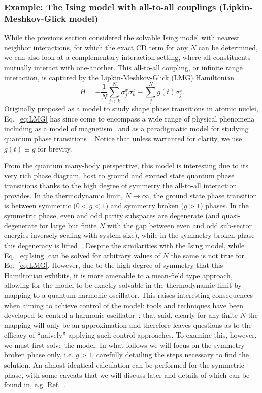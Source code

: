 \subsubsection{Example: The Ising model with all-to-all couplings (Lipkin-Meshkov-Glick model)}
\label{ex:LMGmodel}
While the previous section considered the solvable Ising model with nearest neighbor interactions, for which the exact CD term for any $N$ can be determined, we can also look at a complementary interaction setting, where all constituents mutually interact with one-another. This all-to-all coupling, or infinite range interaction, is captured by the Lipkin-Meshkov-Glick (LMG) Hamiltonian
\begin{equation}\label{eq:LMG}
H = - \frac{1}{N}\sum_{j<k}^N \sigma^x_j \sigma^x_{k} -\sum_j^N g(t) \sigma_j^z.
\end{equation}
Originally proposed as a model to study shape phase transitions in atomic nuclei, Eq.~\eqref{eq:LMG} has since come to encompass a wide range of physical phenomena including as a model of magnetism~\cite{LMG1, LMG2} and as a paradigmatic model for studying quantum phase transitions~\cite{ESQPTreview}. Notice that unless warranted for clarity, we use $g(t)\equiv g$ for brevity.

From the quantum many-body perspective, this model is interesting due to its very rich phase diagram, host to ground and excited state quantum phase transitions thanks to the high degree of symmetry the all-to-all interaction provides. In the thermodynamic limit, $N\to \infty$, the ground state phase transition is between symmetric ($0\!<\!g\!<\!1$) and symmetry broken ($g\!>\!1$) phases. In the symmetric phase, even and odd parity subspaces are degenerate (and quasi-degenerate for large but finite $N$ with the gap between even and odd sub-sector energies inversely scaling with system size), while in the symmetry broken phase this degeneracy is lifted~\cite{LMG1, FazioLMG}. Despite the similarities with the Ising model, while Eq.~\eqref{eq:Ising} can be solved for arbitrary values of $N$ the same is not true for Eq.~\eqref{eq:LMG}. However, due to the high degree of symmetry that this Hamiltonian exhibits, it is more amenable to a mean-field type approach, allowing for the model to be exactly solvable in the thermodynamic limit by mapping to a quantum harmonic oscillator. This raises interesting consequences when aiming to achieve control of the model: tools and techniques have been developed to control a harmonic oscillator~\cite{MugaJPB}; that said, clearly for any finite $N$ the mapping will only be an approximation and therefore leaves questions as to the efficacy of ``naively'' applying such control approaches. To examine this, however, we must first solve the model. In what follows we will focus on the symmetry broken phase only, i.e. $g>1$, carefully detailing the steps necessary to find the solution. An almost identical calculation can be performed for the symmetric phase, with some caveats that we will discuss later and details of which can be found in, e.g. Ref.~\cite{TakahashiPRE}. 

